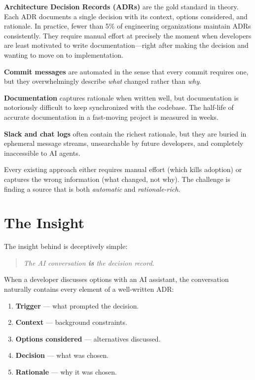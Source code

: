 \textbf{Architecture Decision Records (ADRs)} are the gold standard in theory.
Each ADR documents a single decision with its context, options considered, and
rationale.  In practice, fewer than 5\% of engineering organizations maintain
ADRs consistently.  They require manual effort at precisely the moment when
developers are least motivated to write documentation---right after making the
decision and wanting to move on to implementation.

\textbf{Commit messages} are automated in the sense that every commit requires
one, but they overwhelmingly describe \emph{what} changed rather than
\emph{why}.

\textbf{Documentation} captures rationale when written well, but documentation
is notoriously difficult to keep synchronized with the codebase.  The half-life
of accurate documentation in a fast-moving project is measured in weeks.

\textbf{Slack and chat logs} often contain the richest rationale, but they are
buried in ephemeral message streams, unsearchable by future developers, and
completely inaccessible to AI agents.

\begin{keyinsight}
Every existing approach either requires manual effort (which kills adoption) or
captures the wrong information (what changed, not why).  The challenge is
finding a source that is both \emph{automatic} and \emph{rationale-rich}.
\end{keyinsight}

\section{The Insight}
\label{sec:the-insight}

The insight behind \sysname{} is deceptively simple:

\begin{quote}
\emph{The AI conversation \textbf{is} the decision record.}
\end{quote}

When a developer discusses options with an AI assistant, the conversation
naturally contains every element of a well-written ADR:

\begin{enumerate}
    \item \textbf{Trigger} --- what prompted the decision.
    \item \textbf{Context} --- background constraints.
    \item \textbf{Options considered} --- alternatives discussed.
    \item \textbf{Decision} --- what was chosen.
    \item \textbf{Rationale} --- why it was chosen.
\end{enumerate}

